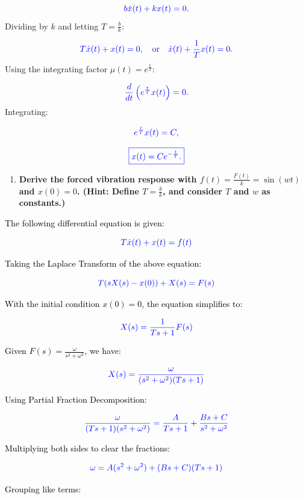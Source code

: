\documentclass[12pt]{article}
\begin{document}
\[
	\textcolor{blue}{b \dot{x}(t) + k x(t) = 0.}
\]
Dividing by \( k \) and letting \( T = \frac{b}{k} \):
	      
\[
	\textcolor{blue}{T \dot{x}(t) + x(t) = 0, \quad \text{or} \quad \dot{x}(t) + \frac{1}{T} x(t) = 0.}
\]
Using the integrating factor \( \mu(t) = e^{\frac{t}{T}} \):
	      
\[
	\textcolor{blue}{\frac{d}{dt} \left( e^{\frac{t}{T}} x(t) \right) = 0.}
\]
Integrating:
	      
\[
	\textcolor{blue}{e^{\frac{t}{T}} x(t) = C,}
\]
	      
\[
	\textcolor{blue}{\boxed{x(t) = C e^{-\frac{t}{T}}.}}
\]
	      
	          
\newpage
\begin{enumerate}
	\item[(c)] \textbf{Derive the forced vibration response with $f(t) = \frac{F(t)}{k} = \sin(wt)$ and $x(0) = 0$. (Hint: Define $T = \frac{b}{k}$, and consider $T$ and $w$ as constants.)}
\end{enumerate}
	      
	      
\noindent
\textcolor{black}{The following differential equation is given:}

\[
	\textcolor{blue}{T \dot{x}(t) + x(t) = f(t)}
\]

\noindent
\textcolor{black}{Taking the Laplace Transform of the above equation:}

\[
	\textcolor{blue}{T(sX(s) - x(0)) + X(s) = F(s)}
\]

\noindent
\textcolor{black}{With the initial condition \( x(0) = 0 \), the equation simplifies to:}

\[
	\textcolor{blue}{X(s) = \frac{1}{Ts + 1} F(s)}
\]

\noindent
\textcolor{black}{Given \( F(s) = \frac{\omega}{s^2 + \omega^2} \), we have:}

\[
	\textcolor{blue}{X(s) = \frac{\omega}{(s^2 + \omega^2)(Ts + 1)}}
\]

\noindent
\textcolor{black}{Using Partial Fraction Decomposition:}

\[
	\textcolor{blue}{\frac{\omega}{(Ts + 1)(s^2 + \omega^2)} = \frac{A}{Ts + 1} + \frac{Bs + C}{s^2 + \omega^2}}
\]

\noindent
\textcolor{black}{Multiplying both sides to clear the fractions:}

\[
	\textcolor{blue}{\omega = A(s^2 + \omega^2) + (Bs + C)(Ts + 1)}
\]

\noindent
\textcolor{black}{Grouping like terms:}
\end{document}
